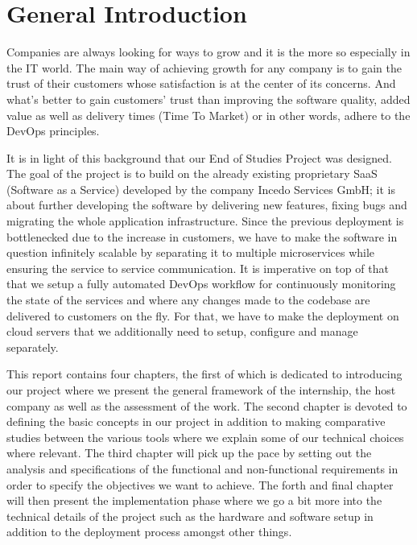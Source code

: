 \section*{General Introduction}
Companies are always looking for ways to grow and it is the more so especially in the IT world. The main way of achieving growth for any company is to gain the trust of their customers whose satisfaction is at the center of its concerns.
And what's better to gain customers' trust than improving the software quality, added value as well as delivery times (Time To Market) or in other words, adhere to the DevOps principles.

\medskip
\noindent It is in light of this background that our End of Studies Project was designed. The goal of the project is to build on the already existing proprietary SaaS (Software as a Service) developed by the company Incedo Services GmbH; it is about further developing the software by delivering new features, fixing bugs and migrating the whole application infrastructure.
Since the previous deployment is bottlenecked due to the increase in customers, we have to make the software in question infinitely scalable by separating it to multiple microservices while ensuring the service to service communication.
It is imperative on top of that that we setup a fully automated DevOps workflow for continuously monitoring the state of the services and where any changes made to the codebase are delivered to customers on the fly.
For that, we have to make the deployment on cloud servers that we additionally need to setup, configure and manage separately.

\medskip
\noindent This report contains four chapters, the first of which is dedicated to introducing our project where we present the general framework of the internship, the host company as well as the assessment of the work. The second chapter is devoted to defining the basic concepts in our project in addition to making comparative studies between the various tools where we explain some of our technical choices where relevant. The third chapter will pick up the pace by setting out the analysis and specifications of the functional and non-functional requirements in order to specify the objectives we want to achieve. The forth and final chapter will then present the implementation phase where we go a bit more into the technical details of the project such as the hardware and software setup in addition to the deployment process amongst other things.

\newpage
